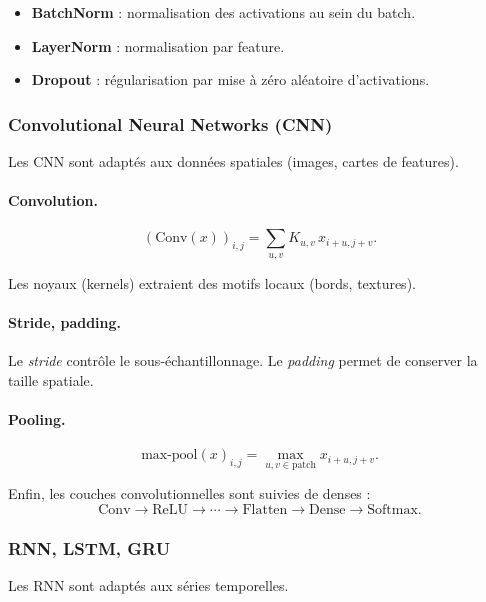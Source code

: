 \documentclass[11pt,a4paper]{article}
\newcommand{\1}{\mathbf{1}}
\begin{document}
\begin{itemize}
  \item \textbf{BatchNorm} : normalisation des activations au sein du batch.
  \item \textbf{LayerNorm} : normalisation par feature.
  \item \textbf{Dropout} : régularisation par mise à zéro aléatoire d'activations.
\end{itemize}

\subsubsection{Convolutional Neural Networks (CNN)}

Les CNN sont adaptés aux données spatiales (images, cartes de features).

\paragraph{Convolution.}

\[
(\text{Conv}(x))_{i,j}
=
\sum_{u,v} K_{u,v}\, x_{i+u,j+v}.
\]

Les noyaux (kernels) extraient des motifs locaux (bords, textures).

\paragraph{Stride, padding.}

Le \emph{stride} contrôle le sous-échantillonnage.
Le \emph{padding} permet de conserver la taille spatiale.

\paragraph{Pooling.}

\[
\text{max-pool}(x)_{i,j} = \max_{u,v \in \text{patch}} x_{i+u,j+v}.
\]

Enfin, les couches convolutionnelles sont suivies de denses :
\[
\text{Conv} \to \text{ReLU} \to \cdots \to \text{Flatten} \to \text{Dense} \to \text{Softmax}.
\]

\subsubsection{RNN, LSTM, GRU}

Les RNN sont adaptés aux séries temporelles.
\end{document}
